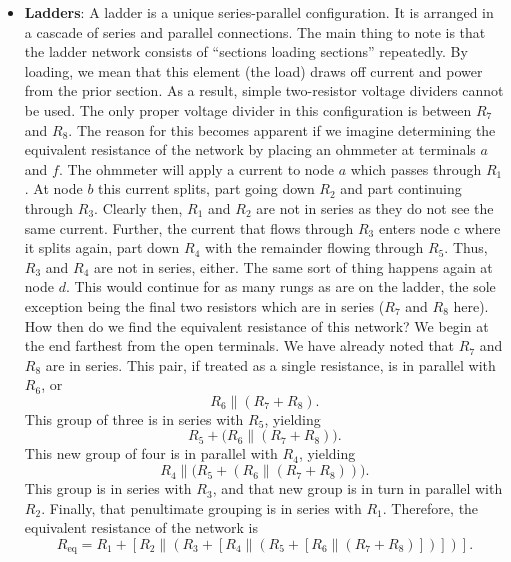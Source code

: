 \documentclass{report}
\begin{document}
\begin{itemize}
        \item \textbf{Ladders}: A ladder is a unique series-parallel configuration. It is arranged in a cascade of series and parallel connections.
            \bigbreak \noindent 
            \bigbreak \noindent 
            The main thing to note is that the ladder network consists of “sections loading sections” repeatedly. By loading, we mean that this element (the load) draws off current and power from the prior section. As a result, simple two-resistor voltage dividers cannot be used.
            \bigbreak \noindent 
            The only proper voltage divider in this configuration is between $R_{7}$ and $R_{8}$. The reason for this becomes apparent if we imagine determining the equivalent resistance of the network by placing an ohmmeter at terminals $a$ and $f$. The ohmmeter will apply a current to node $a$ which passes through $R_1$. At node $b$ this current splits, part going down $R_2$ and part continuing through $R_3$. Clearly then, $R_1$ and $R_2$ are not in series as they do not see the same current. Further, the current that flows through $R_3$ enters node c where it splits again, part down $R_4$ with the remainder flowing through $R_5$. Thus, $R_3$ and $R_4$ are not in series, either. The same sort of thing happens again at node $d$. This would continue for as many rungs as are on the ladder, the sole exception being the final two resistors which are in series ($R_7$ and $R_8$ here).
            \bigbreak \noindent 
            How then do we find the equivalent resistance of this network? We begin at the end farthest from the open terminals. 
            We have already noted that \(R_7\) and \(R_8\) are in series. This pair,
            if treated as a single resistance, is in parallel with \(R_6\), or
            \[
                R_6 \parallel (R_7 + R_8).
            \]
            This group of three is in series with \(R_5\), yielding
            \[
                R_5 + \bigl(R_6 \parallel (R_7 + R_8)\bigr).
            \]
            This new group of four is in parallel with \(R_4\), yielding
            \[
                R_4 \parallel \bigl(R_5 + (R_6 \parallel (R_7 + R_8))\bigr).
            \]
            This group is in series with \(R_3\), and that new group is in turn in
            parallel with \(R_2\). Finally, that penultimate grouping is in series
            with \(R_1\). Therefore, the equivalent resistance of the network is
            \[
                R_{\mathrm{eq}} = R_1 + \left[ R_2 \parallel \left( R_3 + \left[ R_4 \parallel \left( R_5 + \left[ R_6 \parallel (R_7 + R_8) \right] \right) \right] \right) \right].
\]
\end{itemize}
\end{document}
